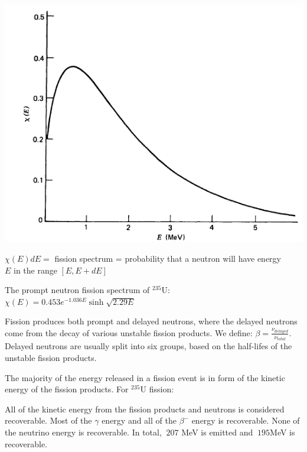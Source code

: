 \documentclass[12pt]{article}
\newif\ifeqns
\begin{document}
\begin{center}
\includegraphics[scale=0.6]{../figs/fissionspectrum}
\end{center}
$\chi(E)dE=$ fission spectrum = probability that a neutron will have energy\\ $E$ in the range $[E, E+dE]$

The prompt neutron fission spectrum of $^{235}$U: $\chi(E) = 0.453 e^{-1.036E}\sinh\sqrt{2.29E}$

Fission produces both prompt and delayed neutrons, where the delayed neutrons come from the decay of various unstable fission products. We define: $\beta=\frac{\nu_{delayed}}{\nu_{total}}$. Delayed neutrons are usually split into six groups, based on the half-lifes of the unstable fission products.

The majority of the energy released in a fission event is in form of the kinetic energy of the fission products. For $^{235}$U fission:

\ifeqns
KE of FP $\approx 168$ MeV

KE of $n\approx 5$ MeV

prompt $\gamma$ E$\approx 7$ MeV

$\beta^- $ E from FP decay $\approx 8$ MeV

$\gamma $ E from FP decay $\approx 7$ MeV

neutrino E from FP decay $\approx 12$ MeV
\else
\vspace*{6 em}
\fi

All of the kinetic energy from the fission products and neutrons is considered recoverable. Most of the $\gamma$ energy and all of the $\beta^-$ energy is recoverable. None of the neutrino energy is recoverable. In total, $~207$ MeV is emitted and $~195$MeV is recoverable.
\end{document}

